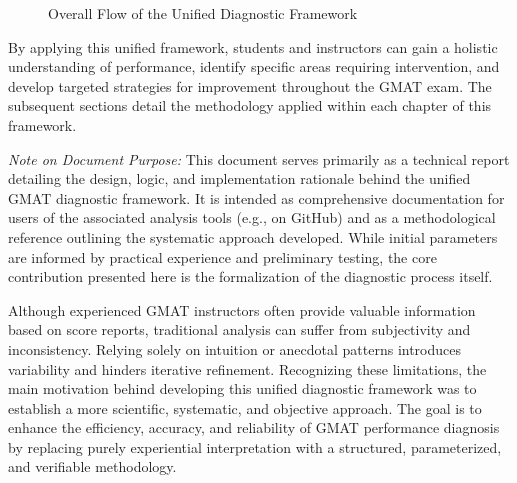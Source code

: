 \documentclass{article}
\begin{document}
\begin{figure}[htbp]
{} %

\vspace{\baselineskip} %

\caption{Overall Flow of the Unified Diagnostic Framework}
\label{fig:framework_flow}
\end{figure}

By applying this unified framework, students and instructors can gain a holistic understanding of performance, identify specific areas requiring intervention, and develop targeted strategies for improvement throughout the GMAT exam. The subsequent sections detail the methodology applied within each chapter of this framework.

\textit{Note on Document Purpose:} This document serves primarily as a technical report detailing the design, logic, and implementation rationale behind the unified GMAT diagnostic framework. It is intended as comprehensive documentation for users of the associated analysis tools (e.g., on GitHub) and as a methodological reference outlining the systematic approach developed. While initial parameters are informed by practical experience and preliminary testing, the core contribution presented here is the formalization of the diagnostic process itself.

Although experienced GMAT instructors often provide valuable information based on score reports, traditional analysis can suffer from subjectivity and inconsistency. Relying solely on intuition or anecdotal patterns introduces variability and hinders iterative refinement. Recognizing these limitations, the main motivation behind developing this unified diagnostic framework was to establish a more scientific, systematic, and objective approach. The goal is to enhance the efficiency, accuracy, and reliability of GMAT performance diagnosis by replacing purely experiential interpretation with a structured, parameterized, and verifiable methodology.
\end{document}
